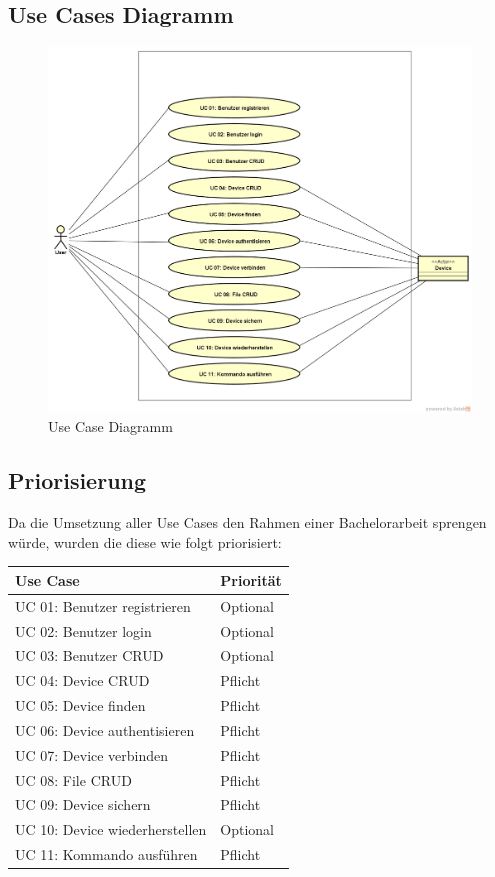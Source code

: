 \subsection{Use Cases Diagramm}
\begin{figure}[H]
\centering
\includegraphics[scale=0.39]{images/use_case_diagram.png}\caption{Use Case Diagramm}
\end{figure}
\newpage
\subsection{Priorisierung}
Da die Umsetzung aller Use Cases den Rahmen einer Bachelorarbeit sprengen würde, wurden die diese wie folgt priorisiert:
\begin{center}
\begin{longtable}{| p{5.5cm} | p{3cm} |}
\hline
\textbf{Use Case} & \textbf{Priorität}\\ \hline
UC 01: Benutzer registrieren     & Optional \\ \hline
UC 02: Benutzer login			 & Optional \\ \hline
UC 03: Benutzer CRUD	         & Optional \\ \hline 
UC 04: Device CRUD               & Pflicht \\ \hline 
UC 05: Device finden			 & Pflicht \\ \hline 
UC 06: Device authentisieren     & Pflicht \\ \hline
UC 07: Device verbinden			 & Pflicht \\ \hline
UC 08: File CRUD				 & Pflicht \\ \hline
UC 09: Device sichern			 & Pflicht \\ \hline
UC 10: Device wiederherstellen	 & Optional \\ \hline
UC 11: Kommando ausführen		 & Pflicht \\ \hline  
\end{longtable}
\end{center}
